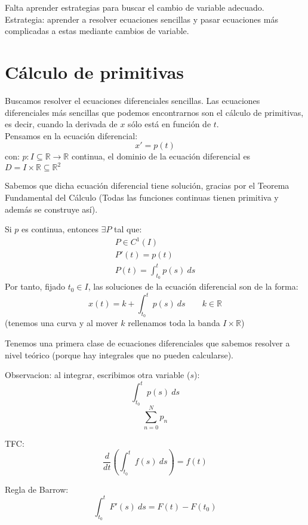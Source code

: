Falta aprender estrategias para buscar el cambio de variable adecuado.
Estrategia: aprender a resolver ecuaciones sencillas y pasar ecuaciones más complicadas a estas mediante cambios de variable.

\section{Cálculo de primitivas}
Buscamos resolver el ecuaciones diferenciales sencillas. Las ecuaciones diferenciales más sencillas que podemos encontrarnos son el cálculo de primitivas, es decir, cuando la derivada de $x$ sólo está en función de $t$.\\

Pensamos en la ecuación diferencial:
\begin{equation*}
    x' = p(t)
\end{equation*}
con: $p:I\subseteq \mathbb{R}\rightarrow\mathbb{R}$ continua, el dominio de la ecuación diferencial es $D = I\times \mathbb{R}\subseteq \mathbb{R}^2$

Sabemos que dicha ecuación diferencial tiene solución, gracias por el Teorema Fundamental del Cálculo (Todas las funciones continuas tienen primitiva y además se construye así).


Si $p$ es continua, entonces $\exists P$ tal que:
\begin{gather*}
    P\in C^1(I) \\
    P'(t) = p(t) \\
    P(t) = \displaystyle\int_{t_0}^{t} p(s)~ds 
\end{gather*}
Por tanto, fijado $t_0 \in I$, las soluciones de la ecuación diferencial son de la forma:
\begin{equation*}
    x(t) = k + \int_{t_0}^{t} p(s)~ds  \qquad k\in \mathbb{R}
\end{equation*}
(tenemos una curva y al mover $k$ rellenamos toda la banda $I\times \mathbb{R}$) 

Tenemos una primera clase de ecuaciones diferenciales que sabemos resolver a nivel teórico (porque hay integrales que no pueden calcularse).

Observacion: al integrar, escribimos otra variable ($s$):
\begin{equation*}
    \int_{t_0}^{t} p(s)~ds 
\end{equation*}
\begin{equation*}
    \sum_{n=0}^{N}p_n
\end{equation*}







TFC\@:
\begin{equation*}
    \dfrac{d}{dt}\left(\displaystyle\int_{t_0}^{t} f(s)~ds \right) = f(t)
\end{equation*}

Regla de Barrow:
\begin{equation*}
    \displaystyle\int_{t_0}^{t} F'(s)~ds  = F(t) - F(t_0)
\end{equation*}
